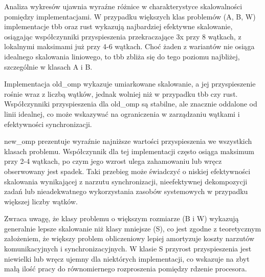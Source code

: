 Analiza wykresów ujawnia wyraźne różnice w charakterystyce skalowalności pomiędzy implementacjami. W przypadku większych klas problemów (A, B, W) implementacje tbb oraz rust wykazują najbardziej efektywne skalowanie, osiągając współczynniki przyspieszenia przekraczające 3x przy 8 wątkach, z lokalnymi maksimami już przy 4-6 wątkach. Choć żaden z wariantów nie osiąga idealnego skalowania liniowego, to tbb zbliża się do tego poziomu najbliżej, szczególnie w klasach A i B.

Implementacja old\_omp wykazuje umiarkowane skalowanie, a jej przyspieszenie rośnie wraz z liczbą wątków, jednak wolniej niż w przypadku tbb czy rust. Współczynniki przyspieszenia dla old\_omp są stabilne, ale znacznie oddalone od linii idealnej, co może wskazywać na ograniczenia w zarządzaniu wątkami i efektywności synchronizacji.

new\_omp prezentuje wyraźnie najniższe wartości przyspieszenia we wszystkich klasach problemu. Współczynnik dla tej implementacji często osiąga maksimum przy 2-4 wątkach, po czym jego wzrost ulega zahamowaniu lub wręcz obserwowany jest spadek. Taki przebieg może świadczyć o niskiej efektywności skalowania wynikającej z narzutu synchronizacji, nieefektywnej dekompozycji zadań lub nieadekwatnego wykorzystania zasobów systemowych w przypadku większej liczby wątków.

Zwraca uwagę, że klasy problemu o większym rozmiarze (B i W) wykazują generalnie lepsze skalowanie niż klasy mniejsze (S), co jest zgodne z teoretycznym założeniem, że większy problem obliczeniowy lepiej amortyzuje koszty narzutów komunikacyjnych i synchronizacyjnych. W klasie S przyrost przyspieszenia jest niewielki lub wręcz ujemny dla niektórych implementacji, co wskazuje na zbyt małą ilość pracy do równomiernego rozproszenia pomiędzy rdzenie procesora.


